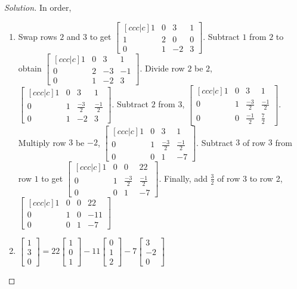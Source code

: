 \documentclass[../main.tex]{subfiles}
\begin{document}
\begin{proof}[Solution]
In order,
\begin{enumerate}
\item Swap rows $2$ and $3$ to get $\begin{bmatrix}[ccc|c] 1 & 0 & 3 & 1 \\ 1 & 2 & 0 & 0 \\ 0 & 1 & -2 & 3 \end{bmatrix}$. Subtract $1$ from $2$ to obtain $\begin{bmatrix}[ccc|c] 1 & 0 & 3 & 1 \\ 0 & 2 & -3 & -1 \\ 0 & 1 & -2 & 3 \end{bmatrix}$. Divide row $2$ be $2$, $\begin{bmatrix}[ccc|c] 1& 0 & 3 & 1 \\ 0 & 1 & \frac{-3}{2} & \frac{-1}{2} \\ 0 & 1 & -2 & 3\end{bmatrix}$. Subtract $2$ from $3$, $\begin{bmatrix}[ccc|c] 1 & 0 & 3 & 1 \\ 0 & 1 & \frac{-3}{2} & \frac{-1}{2} \\ 0 & 0 & \frac{-1}{2} & \frac{7}{2} \end{bmatrix}$. Multiply row $3$ be $-2$, $\begin{bmatrix}[ccc|c] 1 & 0 & 3 & 1 \\ 0 & 1 & \frac{-3}{2} & \frac{-1}{2} \\ 0 & 0 & 1 & -7 \end{bmatrix}$. Subtract $3$ of row $3$ from row $1$ to get $\begin{bmatrix}[ccc|c] 1 & 0 & 0 & 22 \\ 0 & 1 & \frac{-3}{2} & \frac{-1}{2} \\ 0 & 0 & 1 & -7 \end{bmatrix}$. Finally, add $\frac{3}{2}$ of row $3$ to row 2, $\begin{bmatrix}[ccc|c] 1&0&0& 22 \\ 0&1&0&-11 \\ 0 & 0 & 1 & -7 \end{bmatrix}$
\item $\begin{bmatrix} 1 \\ 3 \\ 0 \end{bmatrix} = 22 \begin{bmatrix} 1 \\ 0 \\ 1 \end{bmatrix} - 11\begin{bmatrix} 0 \\ 1 \\ 2 \end{bmatrix} -7 \begin{bmatrix} 3 \\ -2 \\ 0 \end{bmatrix}$

\end{enumerate}
\end{proof}
\end{document}

